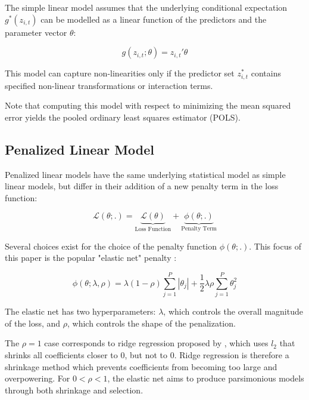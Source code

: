 \documentclass[a4paper, table]{article}
\begin{document}
The simple linear model assumes that the underlying conditional expectation \( g^*(z_{i, t}) \) can be modelled as a linear function of the predictors and the parameter vector \( \theta \):

\begin{equation}
	g(z_{i, t};\theta) = z_{i, t}' \theta
\end{equation}

This model can capture non-linearities only if the predictor set \(z^*_{i, t}\) contains specified non-linear transformations or interaction terms. 

Note that computing this model with respect to minimizing the mean squared error yields the pooled ordinary least squares estimator (POLS).

\subsection{Penalized Linear Model}

Penalized linear models have the same underlying statistical model as simple linear models, but differ in their addition of a new penalty term in the loss function:

\begin{equation}
	\mathcal{L(\theta;.)} = 
	\underset{\text{Loss Function}}{\underbrace{\mathcal{L(\theta)}}} + 
	\underset{\text{Penalty Term}}{\underbrace{\phi(\theta;.)}}
\end{equation}

Several choices exist for the choice of the penalty function \( \phi(\theta;.) \). This focus of this paper is the popular "elastic net" penalty \citep{zou_regularization_2005}:

\begin{equation}
	\phi(\theta;\lambda,\rho) = 
	\lambda(1-\rho) \sum_{j = 1}^{P}|\theta_j| +
	\frac{1}{2} \lambda \rho \sum_{j = 1}^{P}\theta_j^2
\end{equation}

The elastic net has two hyperparameters: $\lambda$, which controls the overall magnitude of the loss, and $\rho$, which controls the shape of the penalization. 

The $\rho = 1$ case corresponds to ridge regression proposed by \cite{hoerl_ridge_1970}, which uses $l_2$ that shrinks all coefficients closer to 0, but not to 0. Ridge regression is therefore a shrinkage method which prevents coefficients from becoming too large and overpowering. For \(0 < \rho < 1\), the elastic net aims to produce parsimonious models through both shrinkage and selection.
\end{document}

